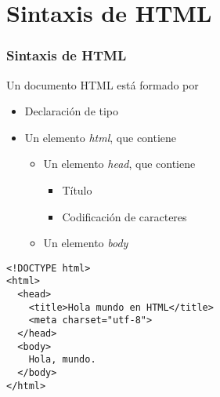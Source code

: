\documentclass[ucs]{beamer}
\begin{document}
\section{Sintaxis de HTML}
\begin{frame}[fragile]
\frametitle{Sintaxis de HTML}
Un documento HTML está formado por

    \begin{itemize}
    \item
Declaración de tipo
    \item
Un elemento \emph{html}, que contiene

    \begin{itemize}
    \item
Un elemento \emph{head}, que contiene

    \begin{itemize}
    \item
Título
    \item
Codificación de caracteres
    \end{itemize}
    \item
Un elemento \emph{body}
    \end{itemize}
    \end{itemize}




  \begin{footnotesize}
  \begin{verbatim}
<!DOCTYPE html>
<html>
  <head>
    <title>Hola mundo en HTML</title>
    <meta charset="utf-8">
  </head>
  <body>
    Hola, mundo.
  </body>
</html>
  \end{verbatim}
  \end{footnotesize}


\end{frame}
\end{document}
